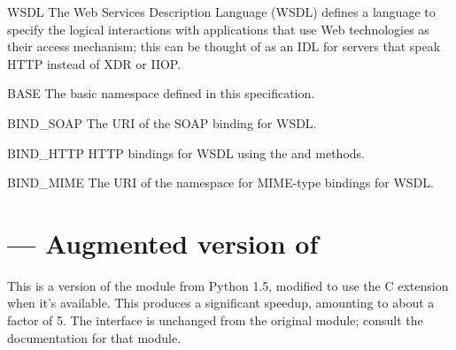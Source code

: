 \documentclass{howto}
\begin{document}
\begin{classdesc*}{WSDL}
  The Web Services Description Language (WSDL) defines a language to
  specify the logical interactions with applications that use Web
  technologies as their access mechanism; this can be thought of as an
  IDL for servers that speak HTTP instead of XDR or IIOP.

  \begin{memberdesc}{BASE}
    The basic namespace defined in this specification.
  \end{memberdesc}

  \begin{memberdesc}{BIND_SOAP}
    The URI of the SOAP binding for WSDL.
  \end{memberdesc}

  \begin{memberdesc}{BIND_HTTP}
    HTTP bindings for WSDL using the  and 
    methods.
  \end{memberdesc}

  \begin{memberdesc}{BIND_MIME}
    The URI of the namespace for MIME-type bindings for WSDL.
  \end{memberdesc}
\end{classdesc*}


\section{ ---
         Augmented version of }

This is a version of the  module from Python 1.5,
modified to use the  C extension when it's available.
This produces a significant speedup, amounting to about a factor of 5.
The interface is unchanged from the original  module;
consult the
 documentation for that module.



\end{document}
